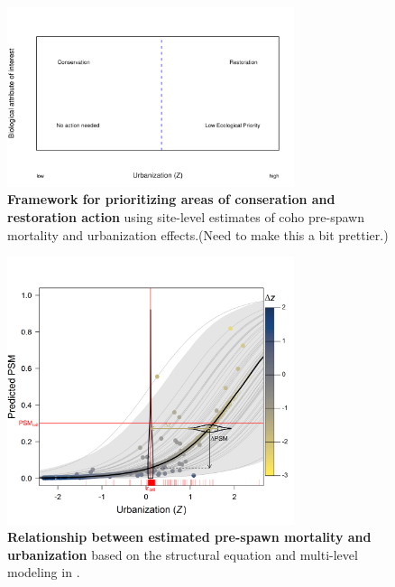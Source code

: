 \documentclass{article}
\begin{document}
\begin{figure}[h!]
\centering
\noindent \includegraphics[width=0.75\textwidth]{..//analysis/results/figures/scheme.pdf}
\caption{\textbf{Framework for prioritizing areas of conseration and restoration action} using site-level estimates of coho pre-spawn mortality and urbanization effects.(Need to make this a bit prettier.)}
\label{fig:frame}
\end{figure}

\begin{figure}[h!]
\centering
\noindent \includegraphics[width=0.75\textwidth]{..//analysis/results/figures/psm_z_threshold.png}
\caption{\textbf{Relationship between estimated pre-spawn mortality and urbanization} based on the structural equation and multi-level modeling in \citep{feist2017}.}
\label{fig:psmz}
\end{figure}
\end{document}
